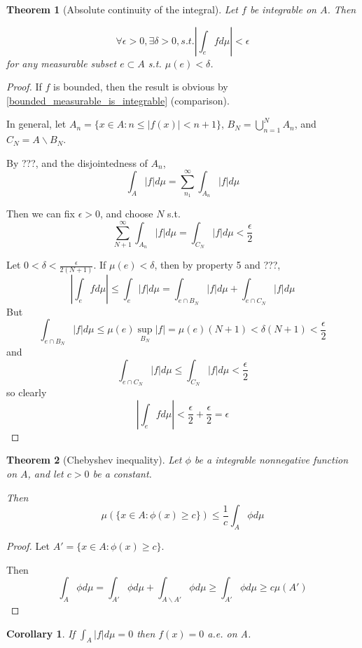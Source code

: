 \documentclass[11pt,a4paper]{report}
\newtheorem{corollary}[theorem]{Corollary}
\theoremstyle{plain}
\newtheorem{thm}{Theorem}[section]
\theoremstyle{definition}
\theoremstyle{remark}
\newcommand{\intersection}{\cap}
\newcommand{\Union}{\bigcup}
\newcommand{\abs}[1]{\left| #1 \right|}
\begin{document}
\begin{thm}[Absolute continuity of the integral]
    Let $f$ be integrable on $A$. Then

    $$ \forall \epsilon > 0, \exists \delta > 0, s.t. \abs{\int_e f d\mu} < \epsilon $$
    for any measurable subset $e \subset A$ s.t. $\mu(e) < \delta$.
\end{thm}

\begin{proof}
    If $f$ is bounded, then the result is obvious by \ref{bounded_measurable_is_integrable} (comparison). %

    In general, let $A_n = \{ x \in A : n \le \abs{f(x)} < n + 1 \}$, $B_N = \Union_{n=1}^N A_n$, and $C_N = A \backslash B_N$.

    By ???, and the disjointedness of $A_n$,
    $$ \int_A \abs{f} d\mu = \sum_{n_1}^\infty \int_{A_n} \abs{f} d\mu $$

    Then we can fix $\epsilon > 0$, and choose $N$ s.t.
    $$ \sum_{N+1}^\infty \int_{A_n} \abs{f} d\mu = \int_{C_N} \abs{f} d\mu < \frac{\epsilon}{2} $$

    Let $ 0 < \delta < \frac{\epsilon}{2(N+1)}$. If $\mu(e) < \delta$, then by property 5 and ???,
    $$ \abs{\int_e f d\mu} \le \int_e \abs{f} d\mu = \int_{e \intersection B_N} \abs{f} d\mu + \int_{e \intersection C_N} \abs{f} d\mu $$
    But
    $$ \int_{e \intersection B_N} \abs{f} d\mu \le \mu(e) \sup_{B_N} \abs{f} = \mu(e)(N + 1) < \delta(N+1) < \frac{\epsilon}{2} $$
    and
    $$ \int_{e \intersection C_N} \abs{f} d\mu \le \int_{C_N} \abs{f} d\mu < \frac{\epsilon}{2} $$
    so clearly
    $$\abs{\int_e f d\mu} < \frac{\epsilon}{2} + \frac{\epsilon}{2} = \epsilon $$
\end{proof}

\begin{thm}[Chebyshev inequality]
    Let $\phi$ be a integrable nonnegative function on $A$, and let $c > 0$ be a constant.

    Then
    $$ \mu(\{ x \in A : \phi(x) \ge c \}) \le \frac{1}{c} \int_A \phi d\mu $$
\end{thm}

\begin{proof}
    Let $A' = \{x \in A : \phi(x) \ge c \}$.

    Then 
    $$ \int_A \phi d\mu = \int_{A'} \phi d\mu + \int_{A \backslash A'} \phi d\mu \ge \int_{A'} \phi d\mu \ge c\mu(A') $$
\end{proof}

\begin{corollary}
    If $\int_A \abs{f} d\mu = 0$ then $f(x) = 0$ a.e. on A.
\end{corollary}
\end{document}
